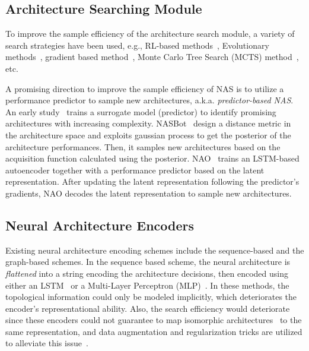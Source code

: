 \documentclass[runningheads]{llncs}
\begin{document}
\subsection{Architecture Searching Module}
To improve the sample efficiency of the architecture search module, a variety of search strategies have been used, e.g., RL-based methods~\cite{zoph2016neural,pham2018efficient}, Evolutionary methods~\cite{liu2017hierarchical,real2019regularized},
gradient based method~\cite{darts}, Monte Carlo Tree Search (MCTS) method~\cite{negrinho2017deeparchitect}, etc.


A promising direction to improve the sample efficiency of NAS is to utilize a performance predictor to sample new architectures, a.k.a. \textit{predictor-based NAS}. An early study~\cite{liu2018progressive} trains a surrogate model 
(predictor) to identify promising architectures with increasing complexity. NASBot~\cite{kandasamy2018bayesian} design a distance metric in the architecture space and exploits gaussian process to get the posterior of the architecture performances. Then, it samples new architectures based on the acquisition function calculated using the posterior.
NAO~\cite{nao2018} trains an LSTM-based autoencoder together with a performance predictor based on the latent representation. After updating the latent representation following the predictor's gradients, NAO decodes the latent representation to sample new architectures.



\subsection{Neural Architecture Encoders}


Existing neural architecture encoding schemes include the sequence-based and the graph-based schemes.
In the sequence based scheme, the neural architecture is {\it flattened} into a string encoding the architecture decisions, then encoded using either an LSTM~\cite{nao2018,liu2018progressive,wang2018alphax} or a Multi-Layer Perceptron (MLP)~\cite{liu2018progressive,wang2018alphax}. 
In these methods, the topological information could only be modeled implicitly, which deteriorates the encoder's representational ability. 
Also, the search efficiency would deteriorate since these encoders could not guarantee to map isomorphic architectures~\cite{ying2019bench,stagge2000neural} to the same representation, and data augmentation and regularization tricks are utilized to alleviate this issue~\cite{nao2018}.
\end{document}
